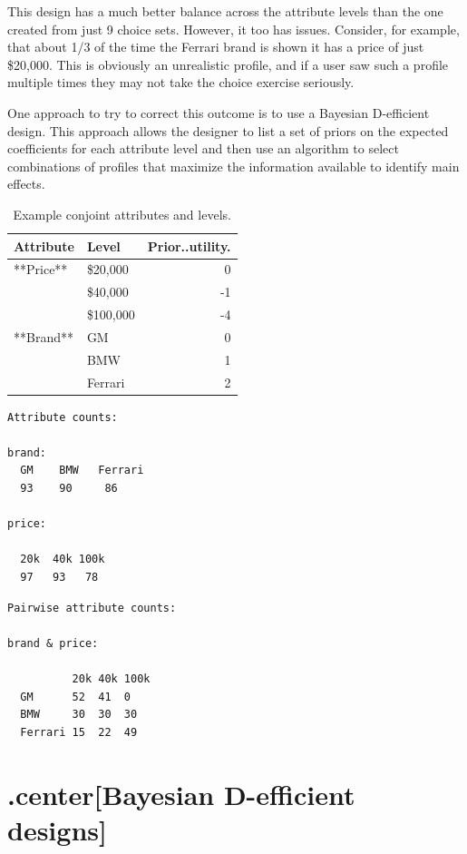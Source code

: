 \documentclass[
  12pt,
]{article}
\begin{document}
This design has a much better balance across the attribute levels than
the one created from just 9 choice sets. However, it too has issues.
Consider, for example, that about 1/3 of the time the Ferrari brand is
shown it has a price of just \$20,000. This is obviously an unrealistic
profile, and if a user saw such a profile multiple times they may not
take the choice exercise seriously.

One approach to try to correct this outcome is to use a Bayesian
D-efficient design. This approach allows the designer to list a set of
priors on the expected coefficients for each attribute level and then
use an algorithm to select combinations of profiles that maximize the
information available to identify main effects.

\begin{table}

\caption{\label{tab:unnamed-chunk-3}Example conjoint attributes and levels.}
\centering
\begin{tabular}[t]{llr}
\toprule
Attribute & Level & Prior..utility.\\
\midrule
**Price** & \$20,000 & 0\\
 & \$40,000 & -1\\
 & \$100,000 & -4\\
**Brand** & GM & 0\\
 & BMW & 1\\
\addlinespace
 & Ferrari & 2\\
\bottomrule
\end{tabular}
\end{table}

\begin{verbatim}
Attribute counts:

brand:
  GM    BMW   Ferrari 
  93    90     86

price:

  20k  40k 100k 
  97   93   78
\end{verbatim}

\begin{verbatim}
Pairwise attribute counts:

brand & price:
         
          20k 40k 100k
  GM      52  41  0
  BMW     30  30  30
  Ferrari 15  22  49
\end{verbatim}

\hypertarget{centerbayesian-d-efficient-designs}{%
\section{.center{[}Bayesian D-efficient
designs{]}}\label{centerbayesian-d-efficient-designs}}
\end{document}
